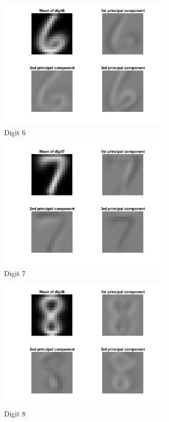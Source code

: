 \documentclass[12pt]{article}
\begin{document}
\begin{figure}[H]
\begin{center}
    \caption{Digit 6}
    \includegraphics[width=0.75\textwidth]{images/digit6.png}
\end{center}
\end{figure}

\begin{figure}[H]
\begin{center}
    \caption{Digit 7}
    \includegraphics[width=0.75\textwidth]{images/digit7.png}
\end{center}
\end{figure}

\begin{figure}[H]
\begin{center}
    \caption{Digit 8}
    \includegraphics[width=0.75\textwidth]{images/digit8.png}
\end{center}
\end{figure}
\end{document}
